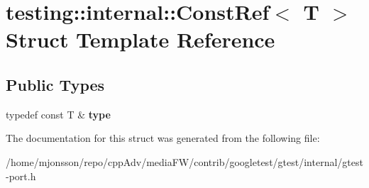 \hypertarget{structtesting_1_1internal_1_1ConstRef}{}\section{testing\+:\+:internal\+:\+:Const\+Ref$<$ T $>$ Struct Template Reference}
\label{structtesting_1_1internal_1_1ConstRef}
\subsection*{Public Types}
\begin{DoxyCompactItemize}
\item 
\mbox{\label{structtesting_1_1internal_1_1ConstRef_a53610a4d0e72958332222b0a85f8937a}} 
typedef const T \& {\bfseries type}
\end{DoxyCompactItemize}


The documentation for this struct was generated from the following file\+:\begin{DoxyCompactItemize}
\item 
/home/mjonsson/repo/cpp\+Adv/media\+F\+W/contrib/googletest/gtest/internal/gtest-\/port.\+h\end{DoxyCompactItemize}
